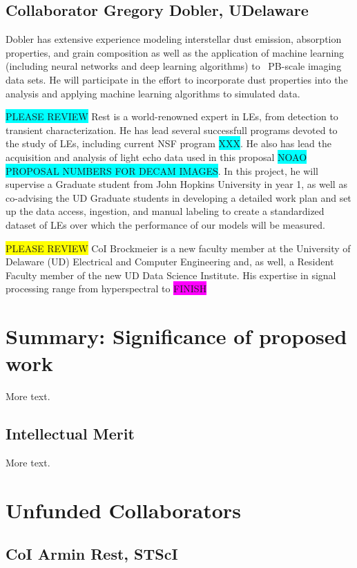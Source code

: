 \documentclass{proposalnsf}
\newcommand{\armin}[1]{\colorbox{cyan}{#1}}
\newcommand{\austin}[1]{\colorbox{yellow}{#1}}
\newcommand{\changeit}[1]{\colorbox{magenta}{#1}}
\begin{document}
\subsection{Collaborator Gregory Dobler, UDelaware}
Dobler has extensive experience modeling interstellar dust emission, absorption properties, and grain composition as well as the application of machine learning (including neural networks and deep learning algorithms) to ~PB-scale imaging data sets. He will participate in the effort to incorporate dust properties into the analysis and applying machine learning algorithms to simulated data.

\armin{PLEASE REVIEW}
Rest is a world-renowned expert in LEs, from detection to transient characterization.  He has lead several successfull programs devoted to the study of LEs, including current NSF program \armin{XXX}.  He also has lead the acquisition and analysis of light echo data used in this proposal \armin{NOAO PROPOSAL NUMBERS FOR DECAM IMAGES}.  In this project, he will supervise a Graduate student from John Hopkins University in year 1, as well as co-advising the UD Graduate students in developing a detailed work plan and set up the data access, ingestion, and manual labeling to create a standardized dataset of LEs over which the performance of our models will be measured.   

\austin{PLEASE REVIEW}
CoI Brockmeier is a new faculty member at the University of Delaware (UD) Electrical and Computer Engineering and, as well, a Resident Faculty member of the new UD Data Science Institute.  His expertise in signal processing range from hyperspectral to \changeit{FINISH}

\section{Summary: Significance of proposed work}

More text.

\subsection{Intellectual Merit}

More text.
\section{Unfunded Collaborators}

\subsection{CoI Armin Rest, STScI}
\end{document}
